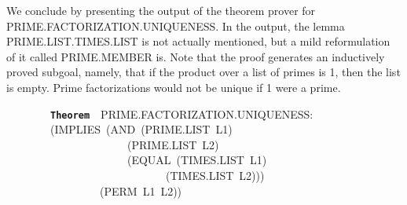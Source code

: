 \documentclass[11pt]{book}
\newenvironment{pubasis}{\begin{flushleft}\ttfamily\small}{\normalsize\rmfamily\end{flushleft}}
\newcommand{\axiomordefinition}[1]{\vspace{6pt}\texttt{\textbf{#1}}}
\begin{document}
We conclude by presenting the output of the theorem
prover for PRIME.FAC\-TOR\-I\-ZA\-TION.UNIQUENESS.
In the output, the lemma PRIME.LIST.TIMES.LIST
is not actually mentioned, but a mild reformulation
of it called PRIME.MEMBER is.  Note that the proof generates an inductively
proved subgoal, namely, that if the product over
a list of primes is 1, then the list is empty.  Prime
factorizations would not be unique if 1 were a prime.
\begin{pubasis}
~~~~~~~~\axiomordefinition{Theorem}~~PRIME.FAC\-TOR\-I\-ZA\-TION.UNIQUENESS:\\
~~~~~~~~(IMPLIES~(AND~(PRIME.LIST~L1)\\
~~~~~~~~~~~~~~~~~~~~~~(PRIME.LIST~L2)\\
~~~~~~~~~~~~~~~~~~~~~~(EQUAL~(TIMES.LIST~L1)\\
~~~~~~~~~~~~~~~~~~~~~~~~~~~~~(TIMES.LIST~L2)))\\
~~~~~~~~~~~~~~~~~(PERM~L1~L2))\\
\end{pubasis}
\end{document}
